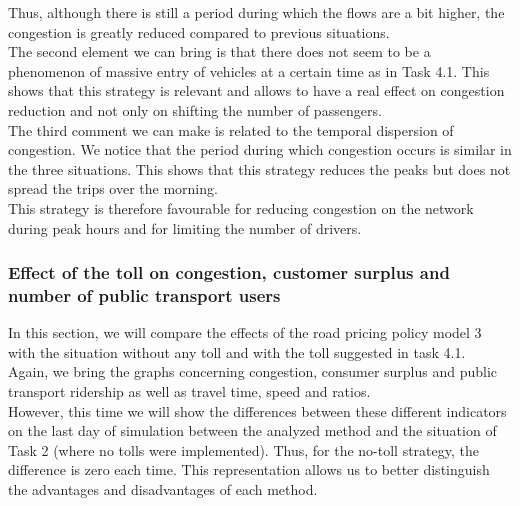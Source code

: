 \documentclass[a4paper, 12pt,oneside]{article}
\begin{document}
Thus, although there is still a period during which the flows are a bit higher, the congestion is greatly reduced compared to previous situations.\\

The second element we can bring is that there does not seem to be a phenomenon of massive entry of vehicles at a certain time as in Task 4.1. This shows that this strategy is relevant and allows to have a real effect on congestion reduction and not only on shifting the number of passengers.\\

The third comment we can make is related to the temporal dispersion of congestion. We notice that the period during which congestion occurs is similar in the three situations. This shows that this strategy reduces the peaks but does not spread the trips over the morning.\\

This strategy is therefore favourable for reducing congestion on the network during peak hours and for limiting the number of drivers.\\


\subsubsection{Effect of the toll on congestion, customer surplus and number of public transport users}

In this section, we will compare the effects of the road pricing policy model 3 with the situation without any toll and with the toll suggested in task 4.1.\\

Again, we bring the graphs concerning congestion, consumer surplus and public transport ridership as well as travel time, speed and ratios.\\

However, this time we will show the differences between these different indicators on the last day of simulation between the analyzed method and the situation of Task 2 (where no tolls were implemented). Thus, for the no-toll strategy, the difference is zero each time. This representation allows us to better distinguish the advantages and disadvantages of each method.\\
\end{document}
